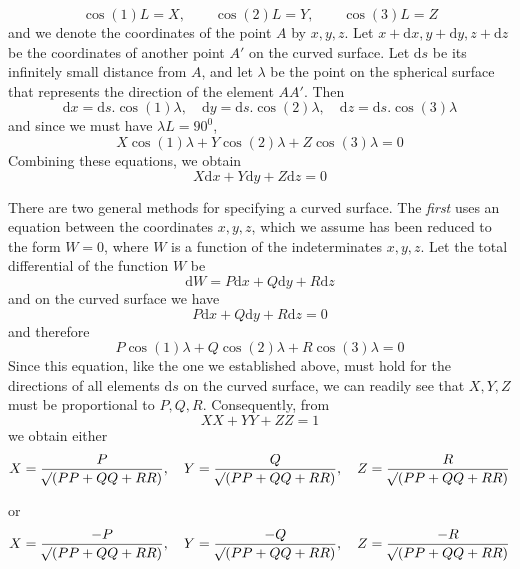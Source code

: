 %
\[
\cos(1)L=X,\qquad\cos(2)L=Y,\qquad\cos(3)L=Z
\]
\noindent and we denote the coordinates of the point \(A\) by \(x,y,z\). Let \(x+\mathrm{d}x,y+\mathrm{d}y,z+\mathrm{d}z\) be the coordinates of another point \(A'\) on the curved surface. Let \(\mathrm{d}s\) be its infinitely small distance from \(A\), and let \(\lambda\) be the point on the spherical surface that represents the direction of the element \(AA'\). Then
\[
\mathrm{d}x=\mathrm{d}s\mathord{.}\cos(1)\lambda,\quad\mathrm{d}y=\mathrm{d}s\mathord{.}\cos(2)\lambda,\quad\mathrm{d}z=\mathrm{d}s\mathord{.}\cos(3)\lambda
\]
\noindent and since we must have \(\lambda L=90^0\),
\[
X\cos(1)\lambda+Y\cos(2)\lambda+Z\cos(3)\lambda=0
\]
\noindent Combining these equations, we obtain
\[
X\mathrm{d}x+Y\mathrm{d}y+Z\mathrm{d}z=0
\]
\par\indent There are two general methods for specifying a curved surface. The \textit{first} uses an equation between the coordinates \(x,y,z\), which we assume has been reduced to the form \(W=0\), where \(W\) is a function of the indeterminates \(x,y,z\). Let the total differential of the function \(W\) be
\[
\mathrm{d}W=P\mathrm{d}x+Q\mathrm{d}y+R\mathrm{d}z
\]
\noindent and on the curved surface we have
\[
P\mathrm{d}x+Q\mathrm{d}y+R\mathrm{d}z=0
\]
\noindent and therefore
\[
P\cos(1)\lambda+Q\cos(2)\lambda+R\cos(3)\lambda=0
\]
\noindent Since this equation, like the one we established above, must hold for the directions of all elements \(\mathrm{d}s\) on the curved surface, we can readily see that \(X,Y,Z\) must be proportional to \(P,Q,R\). Consequently, from
\[
XX+YY+ZZ=1
\]
\noindent we obtain either
\begingroup\small
\[
X=\frac{P}{\mathord{{}^{}\!\surd}(PP+QQ+RR)},\quad Y=\frac{Q}{\mathord{{}^{}\!\surd}(PP+QQ+RR)},\quad Z=\frac{R}{\mathord{{}^{}\!\surd}(PP+QQ+RR)}
\]\endgroup

\noindent or
\begingroup\small
\[
X=\frac{-P}{\mathord{{}^{}\!\surd}(PP+QQ+RR)},\quad Y=\frac{-Q}{\mathord{{}^{}\!\surd}(PP+QQ+RR)},\quad Z=\frac{-R}{\mathord{{}^{}\!\surd}(PP+QQ+RR)}
\]\endgroup

